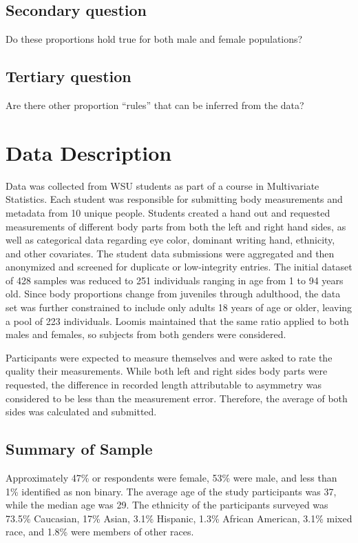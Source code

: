 \documentclass[]{article}
\begin{document}
\subsection{Secondary question}
\label{sec:rq2}

Do these proportions hold true for both male and female populations?

\subsection{Tertiary question}
\label{sec:rq3}

Are there other proportion ``rules'' that can be inferred from the data?

\section{Data Description}
\label{sec:data}

Data was collected from WSU students as part of a course in Multivariate
Statistics. Each student was responsible for submitting body
measurements and metadata from 10 unique people. Students created a hand
out and requested measurements of different body parts from both the
left and right hand sides, as well as categorical data regarding eye
color, dominant writing hand, ethnicity, and other covariates. The
student data submissions were aggregated and then anonymized and
screened for duplicate or low-integrity entries. The initial dataset of
428 samples was reduced to 251 individuals ranging in age from 1 to 94
years old. Since body proportions change from juveniles through
adulthood, the data set was further constrained to include only adults
18 years of age or older, leaving a pool of 223 individuals. Loomis
maintained that the same ratio applied to both males and females, so
subjects from both genders were considered.

Participants were expected to measure themselves and were asked to rate
the quality their measurements. While both left and right sides body
parts were requested, the difference in recorded length attributable to
asymmetry was considered to be less than the measurement error.
Therefore, the average of both sides was calculated and submitted.

\subsection{Summary of Sample}
\label{sec:data-sample}

Approximately 47\% or respondents were female, 53\% were male, and less
than 1\% identified as non binary. The average age of the study
participants was 37, while the median age was 29. The ethnicity of the
participants surveyed was 73.5\% Caucasian, 17\% Asian, 3.1\% Hispanic,
1.3\% African American, 3.1\% mixed race, and 1.8\% were members of
other races.
\end{document}
